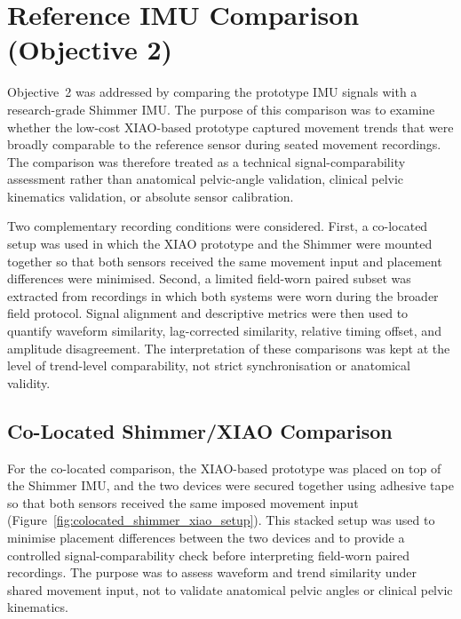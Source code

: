 \section{Reference IMU Comparison (Objective 2)}

Objective~2 was addressed by comparing the prototype IMU signals with a research-grade Shimmer IMU. The purpose of this comparison was to examine whether the low-cost XIAO-based prototype captured movement trends that were broadly comparable to the reference sensor during seated movement recordings. The comparison was therefore treated as a technical signal-comparability assessment rather than anatomical pelvic-angle validation, clinical pelvic kinematics validation, or absolute sensor calibration.

Two complementary recording conditions were considered. First, a co-located setup was used in which the XIAO prototype and the Shimmer were mounted together so that both sensors received the same movement input and placement differences were minimised. Second, a limited field-worn paired subset was extracted from recordings in which both systems were worn during the broader field protocol. Signal alignment and descriptive metrics were then used to quantify waveform similarity, lag-corrected similarity, relative timing offset, and amplitude disagreement. The interpretation of these comparisons was kept at the level of trend-level comparability, not strict synchronisation or anatomical validity.

\subsection{Co-Located Shimmer/XIAO Comparison}\label{sec:colocated_shimmer_xiao}

For the co-located comparison, the XIAO-based prototype was placed on top of the Shimmer IMU, and the two devices were secured together using adhesive tape so that both sensors received the same imposed movement input (Figure~\ref{fig:colocated_shimmer_xiao_setup}). This stacked setup was used to minimise placement differences between the two devices and to provide a controlled signal-comparability check before interpreting field-worn paired recordings. The purpose was to assess waveform and trend similarity under shared movement input, not to validate anatomical pelvic angles or clinical pelvic kinematics.

